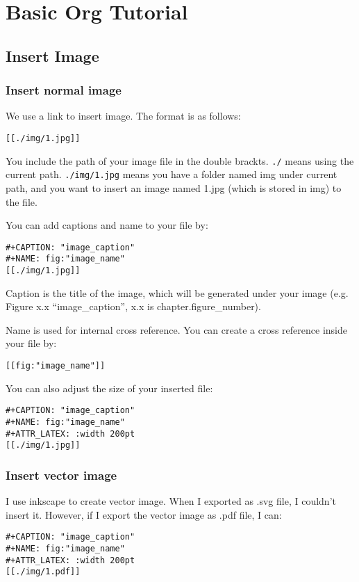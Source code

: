 \documentclass[11pt]{article}
\date{\today}
\title{}
\begin{document}
\tableofcontents

\section{Basic Org Tutorial}
\label{sec:org8484458}
\subsection{Insert Image}
\label{sec:org59b9f18}
\subsubsection{Insert normal image}
\label{sec:orgaa16faa}
We use a link to insert image. The format is as follows:
\begin{Verbatim}[frame=single]
[[./img/1.jpg]]
\end{Verbatim}

You include the path of your image file in the double brackts. \texttt{./} means using the current path. \texttt{./img/1.jpg} means you have a folder named img under current path, and you want to insert an image named 1.jpg (which is stored in img) to the file.

You can add captions and name to your file by:
\begin{Verbatim}[frame=single]
#+CAPTION: "image_caption"
#+NAME: fig:"image_name"
[[./img/1.jpg]]
\end{Verbatim}

Caption is the title of the image, which will be generated under your image (e.g. Figure x.x ``image\_caption'', x.x is chapter.figure\_number).

Name is used for internal cross reference. You can create a cross reference inside your file by:
\begin{Verbatim}[frame=single]
[[fig:"image_name"]]
\end{Verbatim}

You can also adjust the size of your inserted file:
\begin{Verbatim}[frame=single]
#+CAPTION: "image_caption"
#+NAME: fig:"image_name"
#+ATTR_LATEX: :width 200pt
[[./img/1.jpg]]
\end{Verbatim}


\subsubsection{Insert vector image}
\label{sec:org89da954}
I use inkscape to create vector image. When I exported as .svg file, I couldn't insert it. However, if I export the vector image as .pdf file, I can:
\begin{Verbatim}[frame=single]
#+CAPTION: "image_caption"
#+NAME: fig:"image_name"
#+ATTR_LATEX: :width 200pt
[[./img/1.pdf]]
\end{Verbatim}
\end{document}

